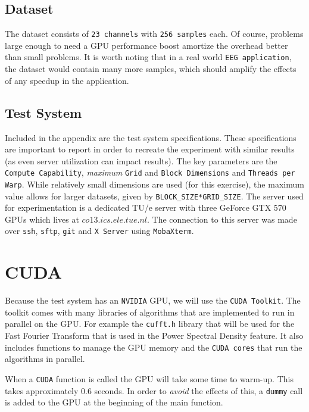 \documentclass[a4paper]{article}
\begin{document}
\subsection{Dataset}
The dataset consists of \texttt{23 channels} with \texttt{256 samples} each. Of course, problems large enough to need a GPU performance boost amortize the overhead better than small problems. It is worth noting that in a real world \texttt{EEG application}, the dataset would contain many more samples, which should amplify the effects of any speedup in the application. 

\subsection{Test System}

Included in the appendix are the test system specifications. These specifications are important to report in order to recreate the experiment with similar results (as even server utilization can impact results). The key parameters are the \texttt{Compute Capability}, \textit{maximum} \texttt{Grid} and \texttt{Block Dimensions} and \texttt{Threads per Warp}. While relatively small dimensions are used (for this exercise), the maximum value allows for larger datasets, given by \texttt{BLOCK\_SIZE*GRID\_SIZE}. The server used for experimentation is a dedicated TU/e server with three GeForce GTX 570 GPUs which lives at $co13.ics.ele.tue.nl$. The connection to this server was made over \texttt{ssh}, \texttt{sftp}, \texttt{git} and \texttt{X Server} using \texttt{MobaXterm}.

\section{CUDA}
Because the test system has an \texttt{NVIDIA} GPU, we will use the \texttt{CUDA Toolkit}. The toolkit comes with many libraries of algorithms that are implemented to run in parallel on the GPU. For example the \texttt{cufft.h} library that will be used for the Fast Fourier Transform that is used in the Power Spectral Density feature. It also includes functions to manage the GPU memory and the \texttt{CUDA cores} that run the algorithms in parallel.

\noindent When a \texttt{CUDA} function is called the GPU will take some time to warm-up. This takes approximately 0.6 seconds. In order to \textit{avoid} the effects of this, a \texttt{dummy} call is added to the GPU at the beginning of the main function.
\end{document}

